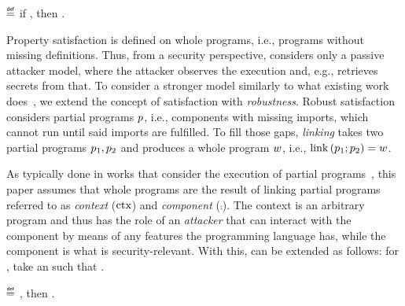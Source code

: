 \begin{definition}\label{def:propsat}
  \bul{$\sat{\wholeprogvar}{\varProp}$}
  $\isdef$
  if \iul{$\forall\trace,\tracegen{\wholeprogvar}{\trace}$},
  then \oul{$\trace\in\varProp$}.
\end{definition}

Property satisfaction is defined on whole programs, i.e., programs without missing definitions.
Thus, from a security perspective,  considers only a passive attacker model, where the attacker observes the execution and, e.g., retrieves secrets from that.
To consider a stronger model similarly to what existing work does~\cite{abate2019jour,abate2021extacc,maffeis2008code-carrying,gordon2003authenticity,fournet2007authorization,bengtson2011refine,backes2014uniontyps,michael2023mswasm,swasey2017robust,sammler2019benefits}, we extend the concept of satisfaction with {\em robustness}.
Robust satisfaction considers partial programs $\progvar$, i.e., components with missing imports, which cannot run until said imports are fulfilled.
To fill those gaps, {\em linking} takes two partial programs $\progvar[_{1}],\progvar[_{2}]$ and produces a whole program $\wholeprogvar$, i.e., $\link{\progvar[_{1}]}{\progvar[_{2}]}=\wholeprogvar$.

As typically done in works that consider the execution of partial programs~\cite{abate2019jour,devriese2018parametricity,patrignani2021rsc,korashy2021capableptrs,strydonck2019lincap,devriese2017modular,bowman2015noninterference,ahmed2011equivcps,patterson2017linkingtyps},
this paper assumes that whole programs are the result of linking partial programs referred to as {\em context} ($\ctx$) and {\em component} ($\comp$).
The context is an arbitrary program and thus has the role of an {\em attacker} that can interact with the component by means of any features the programming language has, while the component is what is security-relevant.
With this,  can be extended as follows: for , take an  such that .

\begin{definition}\label{def:proprsat}
  \bul{$\rsat{\progvar}{\varProp}$}
  $\isdef$ , then \oul{$\sat{\wholeprogvar}{\varProp}$}.
\end{definition}

